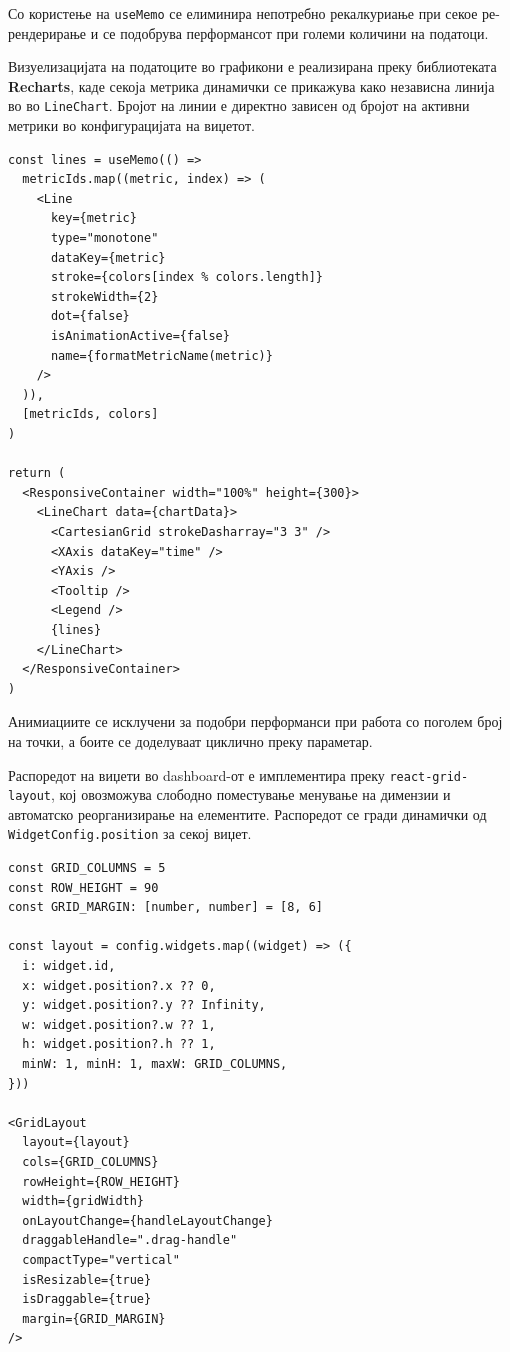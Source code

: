 Со користење на \texttt{useMemo} се елиминира непотребно рекалкуриање при секое ре-рендерирање и се подобрува перформансот при големи количини на податоци.

Визуелизацијата на податоците во графикони е реализирана преку библиотеката \textbf{Recharts}, каде секоја метрика динамички се прикажува како независна линија во во \texttt{LineChart}. Бројот на линии е директно зависен од бројот на активни метрики во конфигурацијата на виџетот.

\begin{verbatim}
const lines = useMemo(() => 
  metricIds.map((metric, index) => (
    <Line
      key={metric}
      type="monotone"
      dataKey={metric}
      stroke={colors[index % colors.length]}
      strokeWidth={2}
      dot={false}
      isAnimationActive={false}
      name={formatMetricName(metric)}
    />
  )),
  [metricIds, colors]
)

return (
  <ResponsiveContainer width="100%" height={300}>
    <LineChart data={chartData}>
      <CartesianGrid strokeDasharray="3 3" />
      <XAxis dataKey="time" />
      <YAxis />
      <Tooltip />
      <Legend />
      {lines}
    </LineChart>
  </ResponsiveContainer>
)
\end{verbatim}

Анимиациите се исклучени за подобри перформанси при работа со поголем број на точки, а боите се доделуваат циклично преку параметар.

Распоредот на виџети во dashboard-от е имплементира преку \texttt{react-grid-layout}, кој овозможува слободно поместување менување на димензии и автоматско реорганизирање на елементите. Распоредот се гради динамички од \texttt{WidgetConfig.position} за секој виџет.

\begin{verbatim}
const GRID_COLUMNS = 5
const ROW_HEIGHT = 90
const GRID_MARGIN: [number, number] = [8, 6]

const layout = config.widgets.map((widget) => ({
  i: widget.id,
  x: widget.position?.x ?? 0,
  y: widget.position?.y ?? Infinity,
  w: widget.position?.w ?? 1,
  h: widget.position?.h ?? 1,
  minW: 1, minH: 1, maxW: GRID_COLUMNS,
}))

<GridLayout
  layout={layout}
  cols={GRID_COLUMNS}
  rowHeight={ROW_HEIGHT}
  width={gridWidth}
  onLayoutChange={handleLayoutChange}
  draggableHandle=".drag-handle"
  compactType="vertical"
  isResizable={true}
  isDraggable={true}
  margin={GRID_MARGIN}
/>
\end{verbatim}



